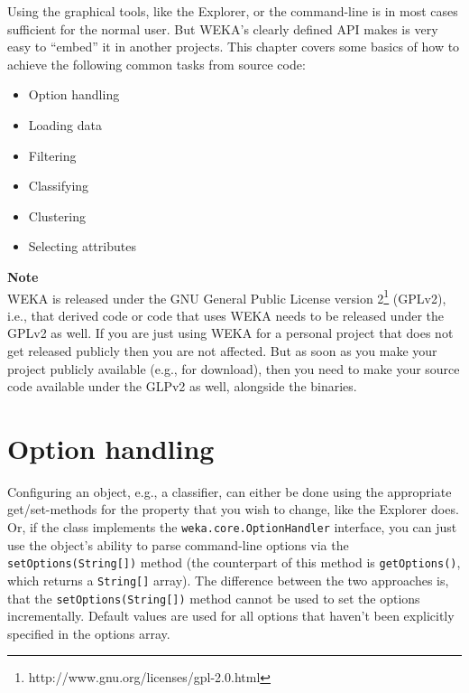 
Using the graphical tools, like the Explorer, or the command-line is in most
cases sufficient for the normal user. But WEKA's clearly defined API makes is
very easy to ``embed'' it in another projects. This chapter covers some basics
of how to achieve the following common tasks from source code:
\begin{itemize}
	\item Option handling
	\item Loading data
	\item Filtering
	\item Classifying
	\item Clustering
	\item Selecting attributes
\end{itemize}

\noindent \textbf{Note} \\
\noindent WEKA is released under the GNU General Public License version
2\footnote{http://www.gnu.org/licenses/gpl-2.0.html} (GPLv2), i.e., that derived
code or code that uses WEKA needs to be released under the GPLv2 as well. If
you are just using WEKA for a personal project that does not get released
publicly then you are not affected. But as soon as you make your project
publicly available (e.g., for download), then you need to make your source code
available under the GLPv2 as well, alongside the binaries.

\newpage

\section{Option handling}
Configuring an object, e.g., a classifier, can either be done using the
appropriate get/set-methods for the property that you wish to change, like the
Explorer does. Or, if the class implements the \texttt{weka.core.OptionHandler}
interface, you can just use the object's ability to parse command-line options
via the \texttt{setOptions(String[])} method (the counterpart of this method is
\texttt{getOptions()}, which returns a \texttt{String[]} array). The
difference between the two approaches is, that the \texttt{setOptions(String[])}
method cannot be used to set the options incrementally. Default values are used
for all options that haven't been explicitly specified in the options array.


